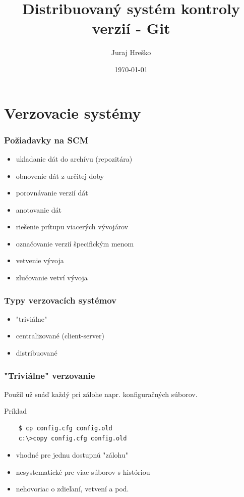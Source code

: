 \documentclass[red]{beamer}
\title{Distribuovaný systém kontroly verzií - Git}
\author{Juraj Hreško}
\institute{ecommerce.cz}
\date{\today}
\begin{document}
\begin{frame}
  \titlepage
\end{frame}


\section{Verzovacie systémy} %



\begin{frame}
  \frametitle{Požiadavky na SCM}   
  \begin{itemize}
  \item ukladanie dát do archívu (repozitára)

  \item obnovenie dát z určitej doby

  \item porovnávanie verzií dát

  \item anotovanie dát

  \item riešenie prítupu viacerých vývojárov

 \item označovanie verzií špecifickým menom

 \item vetvenie vývoja

 \item zlučovanie vetví vývoja
  \end{itemize}
\end{frame}

\begin{frame}
  \frametitle{Typy verzovacích systémov}   
  \begin{itemize}
  \item "triviálne"
  \item centralizované (client-server)
  \item distribuované
  \end{itemize}
\end{frame}

\begin{frame}[fragile]
  \frametitle{"Triviálne"  verzovanie}   
   
  Použil už snáď každý pri zálohe napr. konfiguračných súborov. 

\begin{block}{Príklad}
\begin{verbatim}
    $ cp config.cfg config.old
    c:\>copy config.cfg config.old
\end{verbatim}
\end{block}

\begin{itemize}
\item vhodné pre jednu dostupnú "zálohu"
\item nesystematické pre viac súborov s históriou
\item nehovoriac o zdieľaní, vetvení a pod.
\end{itemize}

\end{frame}
\end{document}
